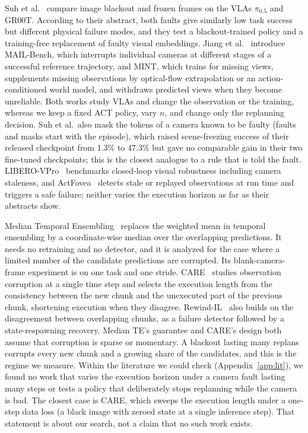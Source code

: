 \documentclass[11pt]{article}
\begin{document}
Suh et al.~\cite{suh2026blackout} compare image blackout and frozen frames on the VLAs $\pi_{0.5}$ and GR00T. According to their abstract, both faults give similarly low task success but different physical failure modes, and they test a blackout-trained policy and a training-free replacement of faulty visual embeddings. Jiang et al.~\cite{jiang2026mint} introduce MAIL-Bench, which interrupts individual cameras at different stages of a successful reference trajectory, and MINT, which trains for missing views, supplements missing observations by optical-flow extrapolation or an action-conditioned world model, and withdraws predicted views when they become unreliable. Both works study VLAs and change the observation or the training, whereas we keep a fixed ACT policy, vary $n$, and change only the replanning decision. Suh et al.\ also mask the tokens of a camera known to be faulty (faults and masks start with the episode), which raised scene-freezing success of their released checkpoint from 1.3\% to 47.3\% but gave no comparable gain in their two fine-tuned checkpoints; this is the closest analogue to a rule that is told the fault. LIBERO-VPro~\cite{li2026vpro} benchmarks closed-loop visual robustness including camera staleness, and ActFovea~\cite{yu2026actfovea} detects stale or replayed observations at run time and triggers a safe failure; neither varies the execution horizon as far as their abstracts show.

Median Temporal Ensembling~\cite{jiang2026mte} replaces the weighted mean in temporal ensembling by a coordinate-wise median over the overlapping predictions. It needs no retraining and no detector, and it is analyzed for the case where a limited number of the candidate predictions are corrupted. Its blank-camera-frame experiment is on one task and one stride. CARE~\cite{yamabe2026care} studies observation corruption at a single time step and selects the execution length from the consistency between the new chunk and the unexecuted part of the previous chunk, shortening execution when they disagree. Rewind-IL~\cite{zheng2026rewind} also builds on the disagreement between overlapping chunks, as a failure detector followed by a state-respawning recovery. Median TE's guarantee and CARE's design both assume that corruption is sparse or momentary. A blackout lasting many replans corrupts every new chunk and a growing share of the candidates, and this is the regime we measure. Within the literature we could check (Appendix~\ref{app:lit}), we found no work that varies the execution horizon under a camera fault lasting many steps or tests a policy that deliberately stops replanning while the camera is bad. The closest case is CARE, which sweeps the execution length under a one-step data loss (a black image with zeroed state at a single inference step). That statement is about our search, not a claim that no such work exists.
\end{document}
